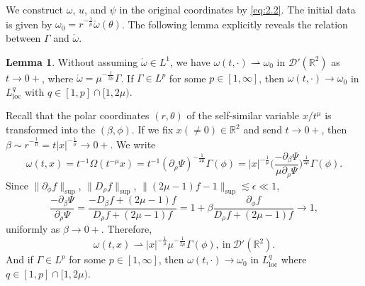 \documentclass[11pt]{article}
\makeatletter
\renewenvironment{proof}[1][\proofname]{\par
  \vspace{-.7\topsep}%
  \pushQED{\qed}%
  \normalfont
  \topsep0pt \partopsep0pt %
  \trivlist
  \item[\hskip\labelsep
        \itshape
    #1\@addpunct{.}]\ignorespaces
}{%
  \popQED\endtrivlist\@endpefalse
  \addvspace{6pt plus 6pt} %
}
\theoremstyle{definition}
\newtheorem{lemma}[theorem]{Lemma}
\theoremstyle{remark}
\numberwithin{equation}{section}
\newcommand{\mbb}{\mathbb}
\newcommand{\mcal}{\mathcal}
\newcommand{\R}{\mbb{R}}
\newcommand{\del}{\partial}
\newcommand{\norm}[1]{\lVert #1 \rVert}
\makeatother
\begin{document}
We construct $\omega$, $u$, and $\psi$ in the original coordinates by \eqref{eq:2.2}. The initial data is given by $\omega_0 = r^{-\frac{1}{\mu}} \mathring{\omega}(\theta)$. The following lemma explicitly reveals the relation between $\Gamma$ and $\mathring{\omega}$.

\begin{lemma} \label{lem:5.9}
Without assuming $\mathring{\omega}\in L^1$, we have $\omega(t,\cdot) \rightharpoonup \omega_0$ in $\mcal{D}'(\R^2)$ as $t\to 0+$, where $\mathring{\omega} = \mu^{-\frac{1}{2\mu}} \Gamma$. If $\Gamma\in L^p$ for some $p\in [1,\infty]$, then $\omega(t,\cdot) \to \omega_0$ in $L^q_{\text{loc}}$ with $q \in [1,p] \cap [1, 2\mu)$.
\end{lemma}
\begin{proof}
Recall that the polar coordinates $(r,\theta)$ of the self-similar variable $x/t^\mu$ is transformed into the $(\beta,\phi)$. If we fix $x(\neq 0)\in\R^2$ and send $t\to 0+$, then $\beta \sim r^{-\frac{1}{\mu}} = t |x|^{-\frac{1}{\mu}} \to 0+$. We write
\[\omega(t,x) = t^{-1} \Omega(t^{-\mu} x) = t^{-1} (\del_\rho \Psi)^{-\frac{1}{2\mu}} \Gamma(\phi) = |x|^{-\frac{1}{\mu}} \Big( \frac{-\del_\beta\Psi}{\mu \del_\rho \Psi} \Big)^{\frac{1}{2\mu}} \Gamma(\phi).\]
Since $\norm{\del_\phi f}_{\sup}$, $\norm{D_\rho f}_{\sup}$, $\norm{(2\mu - 1)f - 1}_{\sup} \lesssim \epsilon \ll 1$,
\[\frac{-\del_\beta\Psi}{\del_\rho \Psi} = \frac{-D_\beta f + (2\mu - 1)f}{D_\rho f + (2\mu - 1)f} = 1 + \beta \frac{\del_\phi f}{D_\rho f + (2\mu - 1) f} \to 1,\]
uniformly as $\beta\to 0+$. Therefore,
\[\omega(t,x) \rightharpoonup |x|^{-\frac{1}{\mu}} \mu^{-\frac{1}{2\mu}} \Gamma(\phi), ~\text{in}~ \mcal{D}'(\R^2).\]
And if $\Gamma\in L^p$ for some $p\in [1,\infty]$, then $\omega(t,\cdot) \to \omega_0$ in $L^q_{\text{loc}}$ where $q \in [1,p] \cap [1, 2\mu)$.
\end{proof}
\end{document}
